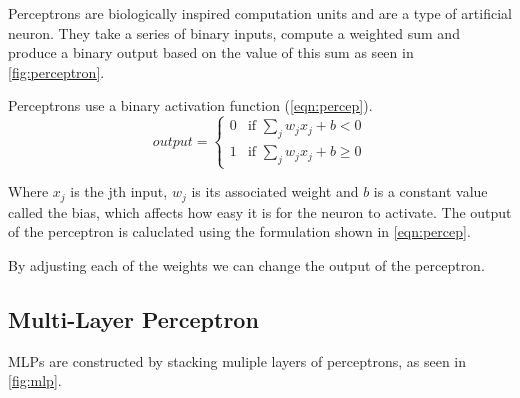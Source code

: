 Perceptrons are biologically inspired computation units and are a type of artificial neuron. They take a series of binary inputs, compute a weighted sum and produce a binary output based on the value of this sum as seen in \autoref{fig:perceptron}.


Perceptrons use a binary activation function (\autoref{eqn:percep}).
\begin{equation} \label{eqn:percep}
output = \begin{cases}
0 &\text{if $\sum_{j} w_j x_j + b < 0$}\\
1 &\text{if $\sum_{j} w_j x_j + b \geq 0$}
\end{cases} 
\end{equation}

Where $x_j$ is the jth input, $w_j$ is its associated weight and $b$ is a constant value called the bias, which affects how easy it is for the neuron to activate. The output of the perceptron is caluclated using the formulation shown in \autoref{eqn:percep}.

By adjusting each of the weights we can change the output of the perceptron. 

%
% 
%
%


\subsection{Multi-Layer Perceptron}
\acp{MLP} are constructed by stacking muliple layers of perceptrons, as seen in \autoref{fig:mlp}.
 
